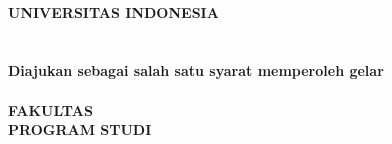 \thispagestyle{empty}
\begin{center}
\bfseries
\vspace*{0.5cm}
\logoui\\[0.8cm]
UNIVERSITAS INDONESIA\\[3cm]
\thejudul\\[3cm]
\thejenis\\[0.8cm]
{\normalsize Diajukan sebagai salah satu syarat memperoleh gelar \thegelar}\\[2.5cm]
\thenama\\[0.3cm]
\thenpm
\vfill
FAKULTAS \thefakultas\\
PROGRAM STUDI \theprodi\\
\thekota\\
\thebulantahun
\end{center}
